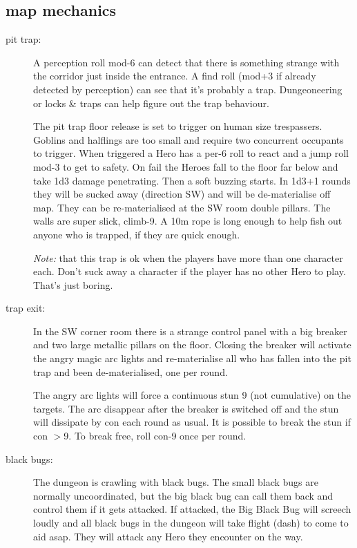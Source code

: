 \subsection*{map mechanics}

\begin{description}
\item[pit trap:] A perception roll mod-6 can detect that there is something strange with the corridor just inside the entrance. A find roll (mod+3 if already detected by perception) can see that it's probably a trap. Dungeoneering or locks \& traps can help figure out the trap behaviour.

The pit trap floor release is set to trigger on human size trespassers. Goblins and halflings are too small and require two concurrent occupants to trigger. When triggered a Hero has a per-6 roll to react and a jump roll mod-3 to get to safety. On fail the Heroes fall to the floor far below and take 1d3 damage penetrating. Then a soft buzzing starts. In 1d3+1 rounds they will be sucked away (direction SW) and will be de-materialise off map. They can be re-materialised at the SW room double pillars.
The walls are super slick, climb-9. A 10m rope is long enough to help fish out anyone who is trapped, if they are quick enough.

\emph{Note:} that this trap is ok when the players have more than one character each. Don't suck away a character if the player has no other Hero to play. That's just boring.

\item[trap exit:] In the SW corner room there is a strange control panel with a big breaker and two large metallic pillars on the floor. Closing the breaker will activate the angry magic arc lights and re-materialise all who has fallen into the pit trap and been de-materialised, one per round.

The angry arc lights will force a continuous stun 9 (not cumulative) on the targets. The arc disappear after the breaker is switched off and the stun will dissipate by con each round as usual. It is possible to break the stun if con $>$9. To break free, roll con-9 once per round.

\item[black bugs:] The dungeon is crawling with black bugs. The small black bugs are normally uncoordinated, but the big black bug can call them back and control them if it gets attacked. If attacked, the Big Black Bug will screech loudly and all black bugs in the dungeon will take flight (dash) to come to aid asap. They will attack any Hero they encounter on the way.


\end{description}
